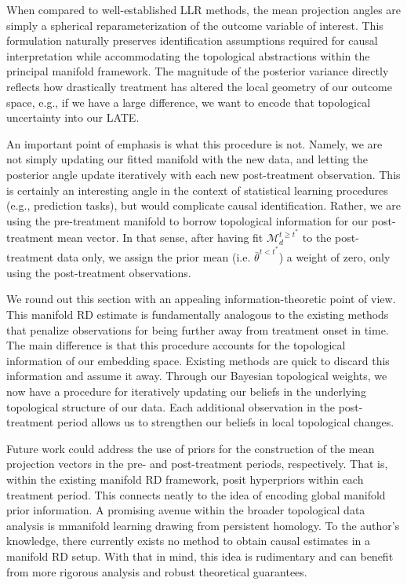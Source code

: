 \documentclass[twoside,11pt]{article}
\begin{document}
When compared to well-established LLR methods, the mean projection angles are simply a spherical reparameterization of the outcome variable of interest. This formulation naturally preserves identification assumptions required for causal interpretation while accommodating the topological abstractions within the principal manifold framework. The magnitude of the posterior variance directly reflects how drastically treatment has altered the local geometry of our outcome space, e.g., if we have a large difference, we want to encode that topological uncertainty into our LATE. 

An important point of emphasis is what this procedure is not. Namely, we are not simply updating our fitted manifold with the new data, and letting the posterior angle update iteratively with each new post-treatment observation. This is certainly an interesting angle in the context of statistical learning procedures (e.g., prediction tasks), but would complicate causal identification. Rather, we are using the pre-treatment manifold to borrow topological information for our post-treatment mean vector. In that sense, after having fit $\mathcal{M}_d^{t \geq t^*}$ to the post-treatment data only, we assign the prior mean (i.e. $\bar{\theta}^{t<t^*}$) a weight of zero, only using the post-treatment observations.

We round out this section with an appealing information-theoretic point of view. This manifold RD estimate is fundamentally analogous to the existing methods that penalize observations for being further away from treatment onset in time. The main difference is that this procedure accounts for the topological information of our embedding space. Existing methods are quick to discard this information and assume it away. Through our Bayesian topological weights, we now have a procedure for iteratively updating our beliefs in the underlying topological structure of our data. Each additional observation in the post-treatment period allows us to strengthen our beliefs in local topological changes. 

Future work could address the use of priors for the construction of the mean projection vectors in the pre- and post-treatment periods, respectively. That is, within the existing manifold RD framework, posit hyperpriors within each treatment period. This connects neatly to the idea of encoding global manifold prior information. A promising avenue within the broader topological data analysis is mmanifold learning drawing from persistent homology. To the author's knowledge, there currently exists no method to obtain causal estimates in a manifold RD setup. With that in mind, this idea is rudimentary and can benefit from more rigorous analysis and robust theoretical guarantees. 
\end{document}
